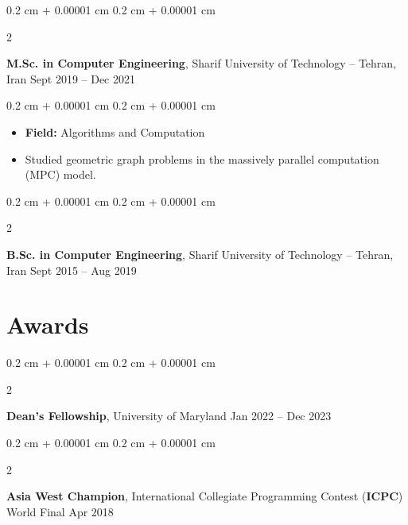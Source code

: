 \documentclass[10pt, letterpaper]{article}
\newenvironment{highlights}{
    \begin{itemize}[
        topsep=0.1 cm,
        parsep=0.10 cm,
        partopsep=0pt,
        itemsep=0pt,
        leftmargin=0.4 cm + 10pt
    ]
}{
    \end{itemize}
} %
\newenvironment{onecolentry}{
    \begin{adjustwidth}{
        0.2 cm + 0.00001 cm
    }{
        0.2 cm + 0.00001 cm
    }
}{
    \end{adjustwidth}
} %
\newenvironment{twocolentry}[2][]{
    \onecolentry
    \def\secondColumn{#2}
    \setcolumnwidth{\fill, 4.5 cm}
    \begin{paracol}{2}
}{
    \switchcolumn \raggedleft \secondColumn
    \end{paracol}
    \endonecolentry
} %
\begin{document}
        \vspace{0.2 cm}

        \begin{twocolentry}{
            Sept 2019 – Dec 2021
        }
            \textbf{M.Sc. in Computer Engineering}, Sharif University of Technology -- Tehran, Iran\end{twocolentry}

        \vspace{0.1 cm}
        \begin{onecolentry}
            \begin{highlights}
                \item \textbf{Field:} Algorithms and Computation
                \item Studied geometric graph problems in the massively parallel computation (MPC) model.
            \end{highlights}
        \end{onecolentry}


        \vspace{0.2 cm}

        \begin{twocolentry}{
            Sept 2015 – Aug 2019
        }
            \textbf{B.Sc. in Computer Engineering}, Sharif University of Technology -- Tehran, Iran\end{twocolentry}




    
    \section{Awards}



        
        \begin{twocolentry}{
            Jan 2022 – Dec 2023
        }
            \textbf{Dean's Fellowship}, University of Maryland\end{twocolentry}



        \vspace{0.2 cm}

        \begin{twocolentry}{
            Apr 2018
        }
            \textbf{Asia West Champion}, International Collegiate Programming Contest (\textbf{ICPC}) World Final\end{twocolentry}



        \vspace{0.2 cm}
\end{document}

